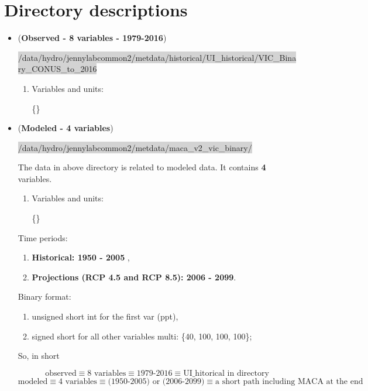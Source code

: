 \section{Directory descriptions}

\begin{itemize}
\item (\textbf{Observed - \textbf{8} variables - 1979-2016}) 

{\scriptsize{\colorbox{lightgray}{/data/hydro/jennylabcommon2/metdata/historical/UI\_historical/VIC\_Binary\_CONUS\_to\_2016}}}

\begin{enumerate}
\item Variables and units: 

\{\}
\end{enumerate}

\item (\textbf{Modeled - \textbf{4} variables}) 

{\scriptsize{\colorbox{lightgray}{/data/hydro/jennylabcommon2/metdata/maca\_v2\_vic\_binary/}}}

The data in above directory is related to modeled data. It contains \textbf{4} variables.

\begin{enumerate}
\item Variables  and units:   

\{\} 
\end{enumerate}

Time periods:
\begin{enumerate}
\item \textbf{Historical: 1950 - 2005} , 
\item \textbf{Projections (RCP 4.5 and RCP 8.5): 2006 - 2099}.
\end{enumerate}
   
Binary format:
\begin{enumerate}
\item unsigned short int for the first var (ppt),
\item signed short for all other variables multi: \{40, 100, 100, 100\};
\end{enumerate}

So, in short 

\[ \text{observed} \equiv  \text{8 variables} \equiv \text{1979-2016} \equiv \text{UI\_hitorical in directory }\]
\vspace{-.2in}
\[ \text{modeled} \equiv  \text{4 variables} \equiv \text{(1950-2005) or (2006-2099)} \equiv \text{a short path including MACA at the end}\]
\end{itemize}

